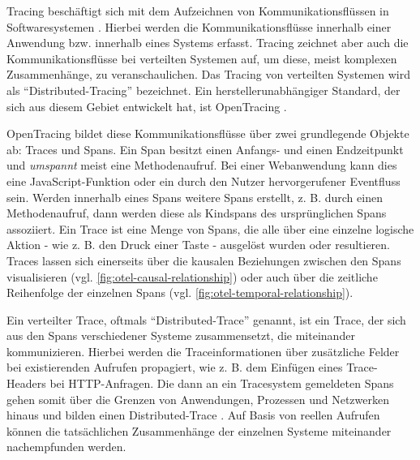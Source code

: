 Tracing beschäftigt sich mit dem Aufzeichnen von Kommunikationsflüssen in Softwaresystemen \cite{TowardsPerformanceToolingInteroperability}. Hierbei werden die Kommunikationsflüsse innerhalb einer Anwendung bzw. innerhalb eines Systems erfasst. Tracing zeichnet aber auch die Kommunikationsflüsse bei verteilten Systemen auf, um diese, meist komplexen Zusammenhänge, zu veranschaulichen. Das Tracing von verteilten Systemen wird als \enquote{Distributed-Tracing} bezeichnet. Ein herstellerunabhängiger Standard, der sich aus diesem Gebiet entwickelt hat, ist OpenTracing \cite{OpenTracing}.

OpenTracing bildet diese Kommunikationsflüsse über zwei grundlegende Objekte ab: Traces und Spans. Ein Span besitzt einen Anfangs- und einen Endzeitpunkt und \textit{umspannt} meist eine Methodenaufruf. Bei einer Webanwendung kann dies eine JavaScript-Funktion oder ein durch den Nutzer hervorgerufener Eventfluss sein. Werden innerhalb eines Spans weitere Spans erstellt, z. B. durch einen Methodenaufruf, dann werden diese als Kindspans des ursprünglichen Spans assoziiert. Ein Trace ist eine Menge von Spans, die alle über eine einzelne logische Aktion - wie z. B. den Druck einer Taste - ausgelöst wurden oder resultieren. Traces lassen sich einerseits über die kausalen Beziehungen zwischen den Spans visualisieren (vgl. \autoref{fig:otel-causal-relationship}) oder auch über die zeitliche Reihenfolge der einzelnen Spans (vgl. \autoref{fig:otel-temporal-relationship}).

Ein verteilter Trace, oftmals \enquote{Distributed-Trace} genannt, ist ein Trace, der sich aus den Spans verschiedener Systeme zusammensetzt, die miteinander kommunizieren. Hierbei werden die Traceinformationen über zusätzliche Felder bei existierenden Aufrufen propagiert, wie z. B. dem Einfügen eines Trace-Headers bei HTTP-Anfragen. Die dann an ein Tracesystem gemeldeten Spans gehen somit über die Grenzen von Anwendungen, Prozessen und Netzwerken hinaus und bilden einen Distributed-Trace \cite{OpenTracingSpecification}. Auf Basis von reellen Aufrufen können die tatsächlichen Zusammenhänge der einzelnen Systeme miteinander nachempfunden werden.

 
